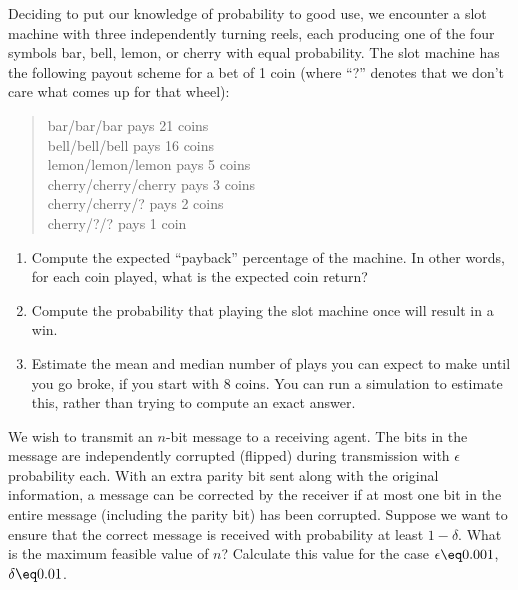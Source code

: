 \begin{iexercise}
Deciding to put our knowledge of probability to good use, we encounter
a slot machine with three independently turning reels, each
producing one of the four symbols {\sc bar}, {\sc bell}, {\sc lemon}, or {\sc cherry} with
equal probability.  The slot machine has the following payout scheme
for a bet of 1 coin (where ``?'' denotes that we don't care what
comes up for that wheel):
%
\begin{verse}
      {\sc bar}/{\sc bar}/{\sc bar}  pays 21 coins \\
      {\sc bell}/{\sc bell}/{\sc bell}  pays 16 coins\\
      {\sc lemon}/{\sc lemon}/{\sc lemon} pays 5 coins\\
      {\sc cherry}/{\sc cherry}/{\sc cherry} pays 3 coins\\
      {\sc cherry}/{\sc cherry}/? pays 2 coins\\
      {\sc cherry}/?/? pays 1 coin
\end{verse}
%
\begin{enumerate}
\item Compute the expected ``payback'' percentage of the machine.  In
other words, for each coin played, what is the expected coin return?
\item Compute the probability that playing the slot machine once
will result in a win.
\item Estimate the mean and median number of plays you can expect to
make until you go broke, if you start with 8 coins.  You can run a
simulation to estimate this, rather than trying to compute an exact
answer.
\end{enumerate}
\end{iexercise} 

\begin{uexercise}
We wish to transmit an \(n\)-bit message to a receiving agent.  The bits in the
message are independently corrupted (flipped) during transmission with
\(\epsilon\) probability each.  With an extra parity bit sent along with
the original information, a message can be corrected by the receiver if at most one bit in
the entire message (including the parity bit) has
been corrupted.  Suppose we want to ensure that the correct message is
received with probability at least \(1-\delta\).
What is the maximum feasible value of \(n\)?
Calculate this value for the case \(\epsilon\eq 0.001\), \(\delta\eq 0.01\).
\end{uexercise} 

